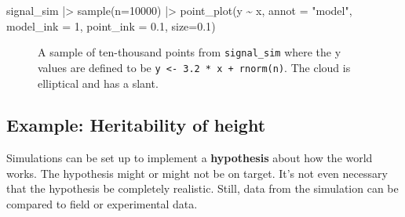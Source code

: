 \documentclass[
  letterpaper,
  DIV=11,
  numbers=noendperiod,
  oneside]{scrartcl}
\newenvironment{Shaded}{\begin{snugshade}}{\end{snugshade}}
\newcommand{\AttributeTok}[1]{\textcolor[rgb]{0.40,0.45,0.13}{#1}}
\newcommand{\DecValTok}[1]{\textcolor[rgb]{0.68,0.00,0.00}{#1}}
\newcommand{\FloatTok}[1]{\textcolor[rgb]{0.68,0.00,0.00}{#1}}
\newcommand{\FunctionTok}[1]{\textcolor[rgb]{0.28,0.35,0.67}{#1}}
\newcommand{\NormalTok}[1]{\textcolor[rgb]{0.00,0.23,0.31}{#1}}
\newcommand{\SpecialCharTok}[1]{\textcolor[rgb]{0.37,0.37,0.37}{#1}}
\newcommand{\StringTok}[1]{\textcolor[rgb]{0.13,0.47,0.30}{#1}}
\begin{document}
\begin{Shaded}
\begin{Highlighting}[]
\NormalTok{signal\_sim }\SpecialCharTok{|\textgreater{}} \FunctionTok{sample}\NormalTok{(}\AttributeTok{n=}\DecValTok{10000}\NormalTok{) }\SpecialCharTok{|\textgreater{}}
  \FunctionTok{point\_plot}\NormalTok{(y }\SpecialCharTok{\textasciitilde{}}\NormalTok{ x, }\AttributeTok{annot =} \StringTok{"model"}\NormalTok{, }
             \AttributeTok{model\_ink =} \DecValTok{1}\NormalTok{, }\AttributeTok{point\_ink =} \FloatTok{0.1}\NormalTok{, }\AttributeTok{size=}\FloatTok{0.1}\NormalTok{)}
\end{Highlighting}
\end{Shaded}

\begin{figure}[H]


\caption{\label{fig-signal-sim}A sample of ten-thousand points from
\texttt{signal\_sim} where the y values are defined to be
\texttt{y\ \textless{}-\ 3.2\ *\ x\ +\ rnorm(n)}. The cloud is
elliptical and has a slant.}

\end{figure}%

\subsection{Example: Heritability of
height}\label{sec-phenotypic-simulation}

Simulations can be set up to implement a \textbf{hypothesis} about how
the world works. The hypothesis might or might not be on target. It's
not even necessary that the hypothesis be completely realistic. Still,
data from the simulation can be compared to field or experimental data.
\end{document}
